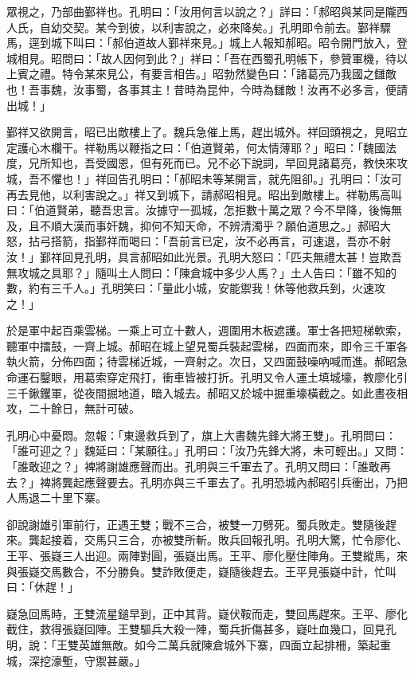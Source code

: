 眾視之，乃部曲鄞祥也。孔明曰：「汝用何言以說之？」詳曰：「郝昭與某同是隴西人氏，自幼交契。某今到彼，以利害說之，必來降矣。」孔明即令前去。鄞祥驟馬，逕到城下叫曰：「郝伯道故人鄞祥來見。」城上人報知郝昭。昭令開門放入，登城相見。昭問曰：「故人因何到此？」祥曰：「吾在西蜀孔明帳下，參贊軍機，待以上賓之禮。特令某來見公，有要言相告。」昭勃然變色曰：「諸葛亮乃我國之讎敵也！吾事魏，汝事蜀，各事其主！昔時為昆仲，今時為讎敵！汝再不必多言，便請出城！」

鄞祥又欲開言，昭已出敵樓上了。魏兵急催上馬，趕出城外。祥回頭視之，見昭立定護心木欄干。祥勒馬以鞭指之曰：「伯道賢弟，何太情薄耶？」昭曰：「魏國法度，兄所知也，吾受國恩，但有死而已。兄不必下說詞，早回見諸葛亮，教快來攻城，吾不懼也！」祥回告孔明曰：「郝昭未等某開言，就先阻卻。」孔明曰：「汝可再去見他，以利害說之。」祥又到城下，請郝昭相見。昭出到敵樓上。祥勒馬高叫曰：「伯道賢弟，聽吾忠言。汝據守一孤城，怎拒數十萬之眾？今不早降，後悔無及，且不順大漢而事奸魏，抑何不知天命，不辨清濁乎？願伯道思之。」郝昭大怒，拈弓搭箭，指鄞祥而喝曰：「吾前言已定，汝不必再言，可速退，吾亦不射汝！」鄞祥回見孔明，具言郝昭如此光景。孔明大怒曰：「匹夫無禮太甚！豈欺吾無攻城之具耶？」隨叫土人問曰：「陳倉城中多少人馬？」土人告曰：「雖不知的數，約有三千人。」孔明笑曰：「量此小城，安能禦我！休等他救兵到，火速攻之！」

於是軍中起百乘雲梯。一乘上可立十數人，週圍用木板遮護。軍士各把短梯軟索，聽軍中擂鼓，一齊上城。郝昭在城上望見蜀兵裝起雲梯，四面而來，即令三千軍各執火箭，分佈四面；待雲梯近城，一齊射之。次日，又四面鼓噪吶喊而進。郝昭急命運石鑿眼，用葛索穿定飛打，衝車皆被打折。孔明又令人運土填城壕，教廖化引三千鍬钁軍，從夜間掘地道，暗入城去。郝昭又於城中掘重壕橫截之。如此晝夜相攻，二十餘日，無計可破。

孔明心中憂悶。忽報：「東邊救兵到了，旗上大書魏先鋒大將王雙」。孔明問曰：「誰可迎之？」魏延曰：「某願往。」孔明曰：「汝乃先鋒大將，未可輕出。」又問：「誰敢迎之？」裨將謝雄應聲而出。孔明與三千軍去了。孔明又問曰：「誰敢再去？」裨將龔起應聲要去。孔明亦與三千軍去了。孔明恐城內郝昭引兵衝出，乃把人馬退二十里下寨。

卻說謝雄引軍前行，正遇王雙；戰不三合，被雙一刀劈死。蜀兵敗走。雙隨後趕來。龔起接着，交馬只三合，亦被雙所斬。敗兵回報孔明。孔明大驚，忙令廖化、王平、張嶷三人出迎。兩陣對圓，張嶷出馬。王平、廖化壓住陣角。王雙縱馬，來與張嶷交馬數合，不分勝負。雙詐敗便走，嶷隨後趕去。王平見張嶷中計，忙叫曰：「休趕！」

嶷急回馬時，王雙流星鎚早到，正中其背。嶷伏鞍而走，雙回馬趕來。王平、廖化截住，救得張嶷回陣。王雙驅兵大殺一陣，蜀兵折傷甚多，嶷吐血幾口，回見孔明，說：「王雙英雄無敵。如今二萬兵就陳倉城外下寨，四面立起排柵，築起重城，深挖濠塹，守禦甚嚴。」

